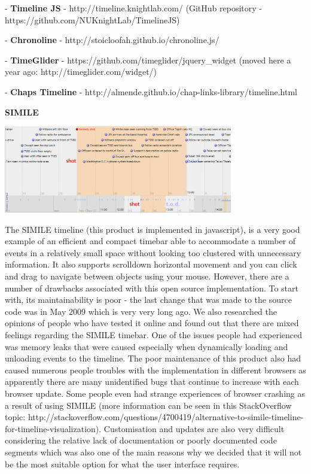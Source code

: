 \documentclass{l3proj}
\begin{document}
- \textbf{Timeline JS} - http://timeline.knightlab.com/ (GitHub repository - https://github.com/NUKnightLab/TimelineJS)

- \textbf{Chronoline} - http://stoicloofah.github.io/chronoline.js/

- \textbf{TimeGlider} - https://github.com/timeglider/jquery_widget (moved here a year ago: http://timeglider.com/widget/)

- \textbf{Chaps Timeline} - http://almende.github.io/chap-links-library/timeline.html



\textbf{SIMILE}

\includegraphics[width=0.75\textwidth]{images/SIMILE.png}

The SIMILE timeline (this product is implemented in javascript), is a very good example of an efficient and compact timebar able to accommodate a number of events in a relatively small space without looking too clustered with unnecessary information. It also supports scrolldown horizontal movement and  you can click and drag to navigate between objects using your mouse. However, there are a number of drawbacks associated with this open source implementation. To start with, its maintainability is poor - the last change that was made to the source code was in May 2009 which is very very long ago. We also researched the opinions of people who have tested it online and found out that there are mixed feelings regarding the SIMILE timebar. One of the issues people had experienced was memory leaks that were caused especially when dynamically loading and unloading events to the timeline. The poor maintenance of this product also had caused numerous people troubles with the implementation in different browsers as apparently there are many unidentified bugs that continue to increase with each browser update. Some people even had strange experiences of browser crashing as a result of using SIMILE (more information can be seen in this StackOverflow topic: http://stackoverflow.com/questions/4700419/alternative-to-simile-timeline-for-timeline-visualization). Customisation and updates are also very difficult considering the relative lack of documentation or poorly documented code segments which was also one of the main reasons why we decided that it will not be the most suitable option for what the user interface requires.
\end{document}
